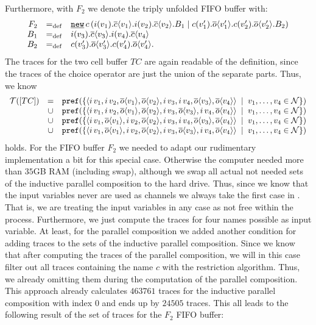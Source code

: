 Furthermore, with $F_2$ we denote the triply unfolded FIFO buffer with:
\begin{align*}
\begin{array}{rcl}
F_2&\define&\procres[()]{c}{\procpar{\inp{i}{v_1}.\out{c}{v_1}.\inp{i}{v_2}.\out{c}{v_2}.B_1}{\inp{c}{v_1'}.\out{o}{v_1'}.\inp{c}{v_2'}.\out{o}{v_2'}.B_2}}\\
B_1&\define&\inp{i}{v_3}.\out{c}{v_3}.\inp{i}{v_4}.\out{c}{v_4} \\
B_2&\define&\inp{c}{v_3'}.\out{o}{v_3'}.\inp{c}{v_4'}.\out{o}{v_4'}.
\end{array}
\end{align*}
The traces for the two cell buffer $TC$ are again readable of the definition, since the traces of the choice operator are just the union of the separate parts. Thus, we know
\begin{align*}
	\begin{array}{rcl}
		\traces[TC]&=&\pref{\set[v_1,\ldots{},v_4\in\names]{\seq{\inpa{i}{v_1},\inpa{i}{v_2},\outa{o}{v_1},\outa{o}{v_2},\inpa{i}{v_3},\inpa{i}{v_4},\outa{o}{v_3},\outa{o}{v_4}}}} \\
				&\cup&\pref{\set[v_1,\ldots{},v_4\in\names]{\seq{\inpa{i}{v_1},\inpa{i}{v_2},\outa{o}{v_1},\outa{o}{v_2},\inpa{i}{v_3},\outa{o}{v_3},\inpa{i}{v_4},\outa{o}{v_4}}}} \\
				&\cup&\pref{\set[v_1,\ldots{},v_4\in\names]{\seq{\inpa{i}{v_1},\outa{o}{v_1},\inpa{i}{v_2},\outa{o}{v_2},\inpa{i}{v_3},\inpa{i}{v_4},\outa{o}{v_3},\outa{o}{v_4}}}} \\
				&\cup&\pref{\set[v_1,\ldots{},v_4\in\names]{\seq{\inpa{i}{v_1},\outa{o}{v_1},\inpa{i}{v_2},\outa{o}{v_2},\inpa{i}{v_3},\outa{o}{v_3},\inpa{i}{v_4},\outa{o}{v_4}}}} 
	\end{array}
\end{align*}
holds. For the FIFO buffer $F_2$ we needed to adapt our rudimentary implementation a bit for this special case. Otherwise the computer needed more than $35$GB RAM (including swap), although we swap all actual not needed sets of the inductive parallel composition to the hard drive. Thus, since we know that the input variables never are used as channels we always take the first case in . That is, we are treating the input variables in any case as not free within the process. Furthermore, we just compute the traces for four names possible as input variable. At least, for the parallel composition we added another condition for adding traces to the sets of the inductive parallel composition. Since we know that after computing the traces of the parallel composition, we will in this case filter out all traces containing the name $c$ with the restriction algorithm. Thus, we already omitting them during the computation of the parallel composition. This approach already calculates $463761$ traces for the inductive parallel composition with index $0$ and ends up by $24505$ traces. This all leads to the following result of the set of traces for the $F_2$ FIFO buffer:
